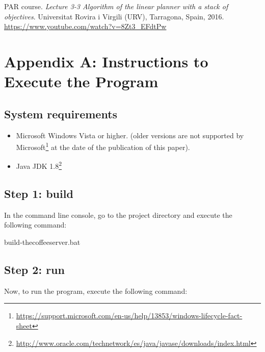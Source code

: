 \documentclass[12pt,a4paper,oneside]{article}
\numberwithin{equation}{section}
\numberwithin{equation}{section}
\theoremstyle{definition}
\begin{document}
\begin{itemize}
\begin{thebibliography}{25}
	
	 PAR course. \textsl{Lecture 3-3 Algorithm of the linear planner with a stack of objectives}. Universitat Rovira i Virgili (URV), Tarragona, Spain, 2016. \url{https://www.youtube.com/watch?v=8Zt3_EFdtPw}
	
\end{thebibliography}



\newpage

\section*{Appendix A: Instructions to Execute the Program} \label{Instructions to Execute the Program}


\subsection*{System requirements}
\begin{itemize}
	\item Microsoft Windows Vista or higher. (older versions are not supported by Microsoft\footnote{\url{https://support.microsoft.com/en-us/help/13853/windows-lifecycle-fact-sheet}} at the date of the publication of this paper).
	\item Java JDK 1.8\footnote{\url{http://www.oracle.com/technetwork/es/java/javase/downloads/index.html}}
\end{itemize}

\subsection*{Step 1: build}
In the command line console, go to the project directory and execute the following command:

\begin{listing}[style=consola, numbers=none]
build-thecoffeeserver.bat
\end{listing}

\subsection*{Step 2: run}
Now, to run the program, execute the following command:


\end{itemize}
\end{document}

